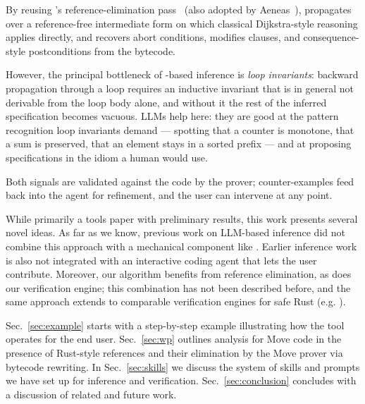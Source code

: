 By reusing \MVP's reference-elimination pass~\cite{DillGPQXZ22} (also adopted by Aeneas~\cite{Aeneas}), \WP propagates over a reference-free intermediate form on which classical Dijkstra-style reasoning applies directly, and recovers abort conditions, modifies clauses, and consequence-style postconditions from the bytecode.

However, the principal bottleneck of \WP-based inference is \emph{loop invariants}: backward propagation through a loop requires an inductive invariant that is in general not derivable from the loop body alone, and without it the rest of the inferred specification becomes vacuous.
LLMs help here: they are good at the pattern recognition loop invariants demand --- spotting that a counter is monotone, that a sum is preserved, that an element stays in a sorted prefix --- and at proposing specifications in the idiom a human would use.

Both signals are validated against the code by the prover; counter-examples feed back into the agent for refinement, and the user can intervene at any point.

 While primarily a tools paper with preliminary results, this work presents several novel ideas.
As far as we know, previous work on LLM-based inference did not combine this approach with a mechanical component like \WP.
Earlier inference work is also not integrated with an interactive coding agent that lets the user contribute.
Moreover, our \WP algorithm benefits from reference elimination, as does our verification engine; this combination has not been described before, and the same approach extends to comparable verification engines for safe Rust (e.g. \cite{Aeneas}).

Sec.~\ref{sec:example} starts with a step-by-step example illustrating how the tool operates for the end user.
Sec.~\ref{sec:wp} outlines \WP analysis for Move code in the presence of Rust-style references and their elimination by the Move prover via bytecode rewriting.
In Sec.~\ref{sec:skills} we discuss the system of skills and prompts we have set up for inference and verification.
Sec.~\ref{sec:conclusion} concludes with a discussion of related and future work.


